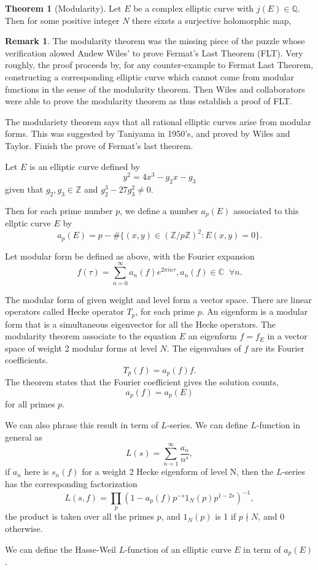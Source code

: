 \documentclass{article}
\newcommand{\Z}{\mathbb{Z}}
\newcommand{\Q}{\mathbb{Q}}
\newcommand{\C}{\mathbb{C}}
\theoremstyle{definition}
\newtheorem{theorem}{Theorem}[section]
\newtheorem{remark}{Remark}[section]
\begin{document}
{\begin{theorem}[Modularity]
Let $E$ be a complex elliptic curve with $j(E) \in \Q$. Then for some positive integer $N$ there eixsts a surjective holomorphic map,
\begin{center}
\end{center}
\end{theorem}

\begin{remark}
The modularity theorem was the missing piece of  the puzzle whose verification alowed Andew Wiles' to prove Fermat's Last Theorem (FLT). Very roughly, the proof proceeds by, for any counter-example to Fermat Last Theorem, constructing a corresponding elliptic curve which cannot come from modular functions in the sense of the modularity theorem. Then Wiles and collaborators were able to prove the modularity theorem as thus establish a proof of FLT. 
\end{remark}


The modulariety theorem says that all rational elliptic curves arise from modular forms. This was suggested by Taniyama in 1950's, and proved by Wiles and Taylor. Finish the prove of Fermat's last theorem.

Let $E$ is an elliptic curve defined by \[y^2 = 4x^3 - g_2x - g_3\] given that $g_2, g_3 \in \Z$ and $g_2^3 - 27 g_3^2 \ne 0$.

Then for each prime number $p$, we define a number $a_p(E)$ associated to this ellptic curve $E$ by 
\[a_p(E) = p - \#\{(x, y) \in (\Z/p\Z)^2: E(x,y) = 0\}.\]

Let modular form be defined as above, with the Fourier expansion 
\[f(\tau) = \sum_{n = 0}^\infty a_n(f) e^{2 \pi i n \tau}, a_n(f) \in \C\;\; \forall n.\]

The modular form of given weight and level form a vector space. There are linear operators called Hecke operator $T_p$, for each prime $p$. An eigenform is a modular form that is a simultaneous eigenvector for all the Hecke operators. The modularity theorem associate to the equation $E$ an eigenform $f = f_E$ in a vector space of weight 2 modular forms at level $N$. The eigenvalues of $f$ are its Fourier coefficients. 
\[T_p(f) = a_p(f)f.\]
The theorem states that the Fourier coefficient gives the solution counts, 
\[a_p(f) = a_p(E)\] for all primes $p$.

We can also phrase this result in term of $L$-series. We can define $L$-function in general as 
\[L(s) = \sum_{n = 1}^\infty \frac{a_n}{n^s},\] if $a_n$ here is $s_n(f)$ for a weight 2 Hecke eigenform of level N, then the $L$-series has the corresponding factorization
\[L(s, f) = \prod_p (1 - a_p(f)p^{-s} 1_N(p)p^{1-2s})^{-1},\]
the product is taken over all the primes $p$, and $1_N(p)$ is 1 if $p \nmid N$, and $0$ otherwise.

We can define the Hasse-Weil $L$-function of an elliptic curve $E$ in term of $a_p(E)$.

}
\end{document}
